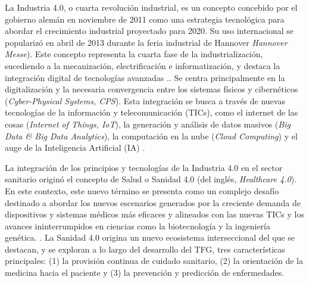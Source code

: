 La Industria 4.0, o cuarta revolución industrial, es un concepto concebido por el gobierno alemán en noviembre de 2011 como una estrategia tecnológica para abordar el crecimiento industrial proyectado para 2020. Su uso internacional se popularizó en abril de 2013 durante la feria industrial de Hannover \textit{Hannover Messe}). Este concepto representa la cuarta fase de la industrialización, sucediendo a la mecanización, electrificación e informatización, y destaca la integración digital de tecnologías avanzadas \cite{lasi2014industry}..
Se centra principalmente en la digitalización y la necesaria convergencia entre los sistemas físicos y cibernéticos (\textit{Cyber-Physical Systems, CPS}). Esta integración se busca a través de nuevas tecnologías de la información y telecomunicación (TICs), como el internet de las cosas (\textit{Internet of Things, IoT}), la generación y análisis de datos masivos (\textit{Big Data \& Big Data Analytics}), la computación en la nube (\textit{Cloud Computing}) y el auge de la Inteligencia Artificial (IA) \cite{lasi2014industry}.\cite{chen2020times}\cite{tortorella2020healthcare}




La integración de los principios y tecnologías de la Industria 4.0 en el sector sanitario originó el concepto de Salud o Sanidad 4.0 (del inglés, \textit{Healthcare 4.0})\cite{tortorella2020healthcare}\cite{tortorella2021impacts}.  %
En este contexto, este nuevo término se presenta como un complejo desafío  destinado a abordar los nuevos escenarios generados por la creciente demanda de dispositivos y sistemas médicos más eficaces y alineados con las nuevas TICs y los avances ininterrumpidos en ciencias como la biotecnología y la ingeniería genética. \cite{martin2021ehealth}. La Sanidad 4.0 origina un nuevo ecosistema interseccional del que se destacan, y se exploran a lo largo del desarrollo del TFG,  tres  características principales: (1) la provisión continua de cuidado sanitario, (2) la orientación de la medicina hacia el paciente y (3) la prevención y predicción de enfermedades.


